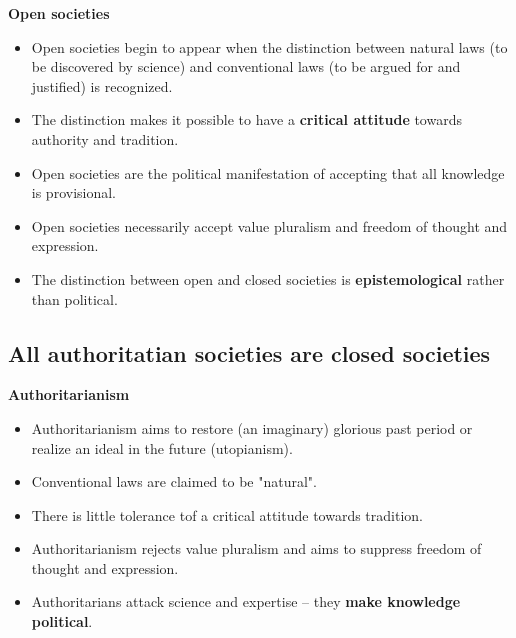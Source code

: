 \textbf{Open societies}
\begin{itemize}
	\item Open societies begin to appear when the distinction between
	 natural laws (to be discovered by science) and conventional laws
	 (to be argued for and justified) is recognized.
	\item The distinction makes it possible to have a \textbf{critical
	 attitude} towards authority and tradition.
	\item Open societies are the political manifestation of accepting that 
	 all knowledge is provisional.
	\item Open societies necessarily accept value pluralism and freedom of
	 thought and expression.
	\item The distinction between open and closed societies is
	 \textbf{epistemological} rather than political.
\end{itemize}

\subsection{All authoritatian societies are closed societies}
\textbf{Authoritarianism}
\begin{itemize}
	\item Authoritarianism aims to restore (an imaginary) glorious past
	 period or realize an ideal in the future (utopianism).
	\item Conventional laws are claimed to be "natural".
	\item There is little tolerance tof a critical attitude towards
	 tradition.
	\item Authoritarianism rejects value pluralism and aims to suppress
	 freedom of thought and expression.
	\item Authoritarians attack science and expertise -- they \textbf{make
	 knowledge political}.
\end{itemize}

